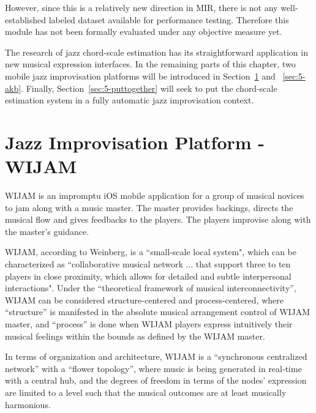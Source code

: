 However, since this is a relatively new direction in MIR, there is not any well-established labeled dataset available for performance testing. Therefore this module has not been formally evaluated under any objective measure yet.

The research of jazz chord-scale estimation has its straightforward application in new musical expression interfaces. In the remaining parts of this chapter, two mobile jazz improvisation platforms will be introduced in Section~\ref{sec:5-wijam} and ~\ref{sec:5-akb}. Finally, Section~\ref{sec:5-puttogether} will seek to put the chord-scale estimation system in a fully automatic jazz improvisation context.

\section{Jazz Improvisation Platform - WIJAM} \label{sec:5-wijam}
WIJAM is an impromptu iOS mobile application for a group of musical novices to jam along with a music master. The master provides backings, directs the musical flow and gives feedbacks to the players. The players improvise along with the master's guidance.

WIJAM, according to Weinberg\cite{weinberg2005interconnected}, is a ``small-scale local system", which can be characterized as ``collaborative musical network ... that support three to ten players in close proximity, which allows for detailed and subtle interpersonal interactions". Under the ``theoretical framework of musical interconnectivity''\cite{weinberg2005interconnected}, WIJAM can be considered structure-centered and process-centered, where ``structure'' is manifested in the absolute musical arrangement control of WIJAM master, and ``process'' is done when WIJAM players express intuitively their musical feelings within the bounds as defined by the WIJAM master.

In terms of organization and architecture, WIJAM is a ``synchronous centralized network'' with a ``flower topology'', where music is being generated in real-time with a central hub, and the degrees of freedom in terms of the nodes' expression are limited to a level such that the musical outcomes are at least musically harmonious.

